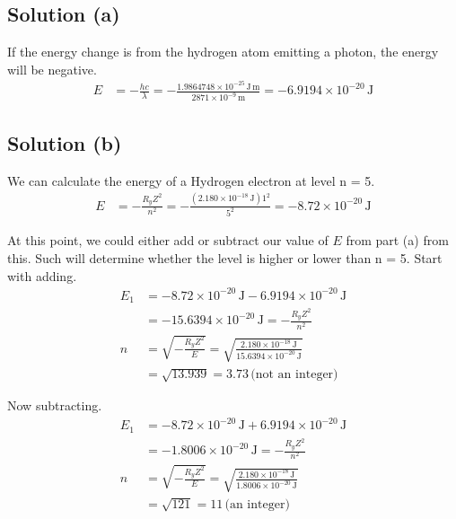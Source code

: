 \documentclass[10pt]{article}
\newcommand{\E}[1]{\times 10^{#1}}
\newcommand{\hc}{1.9864748\E{-25}\,\unit{\joule\,\meter}}
\begin{document}
        \subsection{Solution (a)}
            If the energy change is from the hydrogen atom emitting a photon, the energy will be negative.
            \begin{align}
                E   &=  -\frac{hc}{\lambda}
                    =   -\frac{\hc}{2871\E{-9}\,\unit{\meter}}
                    =   \boxed{-6.9194\E{-20}\,\unit{\joule}}
            \end{align}

        \subsection{Solution (b)}
            We can calculate the energy of a Hydrogen electron at level n = 5. 
            \begin{align}
                E   &=  -\frac{R_y Z^2}{n^2}
                    =   -\frac{(2.180\E{-18}\,\unit{\joule}) 1^2}{5^2}
                    =   -8.72\E{-20}\,\unit{\joule}
            \end{align}

            At this point, we could either add or subtract our value of $E$ from part (a) from this.
            Such will determine whether the level is higher or lower than n = 5.
            Start with adding.
            \begin{align}
                E_1 &=  -8.72\E{-20}\,\unit{\joule} - 6.9194\E{-20}\,\unit{\joule}\\
                    &=  -15.6394\E{-20}\,\unit{\joule}
                    =   -\frac{R_y Z^2}{n^2}\\
                n   &=  \sqrt{-\frac{R_y Z^2}{E}}
                    =   \sqrt{\frac{2.180\E{-18}\,\unit{\joule}}{15.6394\E{-20}\,\unit{\joule}}}\\
                    &=  \sqrt{13.939}
                    =   3.73\,\text{(not an integer)}
            \end{align}

            Now subtracting.
            \begin{align}
                E_1 &=  -8.72\E{-20}\,\unit{\joule} + 6.9194\E{-20}\,\unit{\joule}\\
                    &=  -1.8006\E{-20}\,\unit{\joule}
                    =   -\frac{R_y Z^2}{n^2}\\
                n   &=  \sqrt{-\frac{R_y Z^2}{E}}
                    =   \sqrt{\frac{2.180\E{-18}\,\unit{\joule}}{1.8006\E{-20}\,\unit{\joule}}}\\
                    &=  \sqrt{121}
                    =   11\,\text{(an integer)}
            \end{align}
\end{document}
